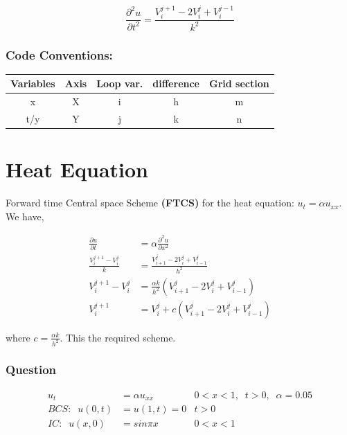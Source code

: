  \[\frac{\partial^2 u}{\partial t^2} = \frac{V_i^{j+1}-2V_i^j+V_i^{j-1}}{k^2}\]

 \vspace{2cm}
 \subsection{Code Conventions:}
 \begin{table}[h!]

     \begin{tabular}{||c c c c c||}
     \hline
     Variables & Axis & Loop var. & difference & Grid section \\ [0.5ex]
     \hline\hline
     x & X & i & h & m \\
     t/y & Y & j & k & n \\[1ex]
     \hline
     \end{tabular}
    \end{table}


 \chapter{Heat Equation}
 Forward time Central space Scheme \textbf{(FTCS)} for the heat equation: \(u_t= \alpha u_{xx}\).\\
 We have,

\begin{align*}
 \frac{\partial u}{\partial t} &= \alpha \frac{\partial^2 u}{\partial x^2} \\
 \frac{V_i^{j+1}-V_i^j}{k} &= \frac{V_{i+1}^j-2V_i^j+V_{i-1}^j}{h^2} \\
 V_i^{j+1}-V_i^j &= \frac{\alpha k}{h^2} (V_{i+1}^j-2V_i^j+V_{i-1}^j) \\
 V_i^{j+1} &= V_i^j+c (V_{i+1}^j-2V_i^j+V_{i-1}^j)
 \end{align*}

 where \( c=\frac{\alpha k}{h^2} \). This the required scheme.
 \vspace{1cm}

\subsection{Question}
\begin{align*}
    u_t&= \alpha u_{xx}           &   0<x<1, \;\; t>0, \;\; \alpha=0.05\\
    BCS:\;\; u(0,t) &= u(1,t)=0   &   t>0\\
    IC:\;\; u(x,0)  &= sin{\pi}x  &   0<x<1
\end{align*}
\clearpage

